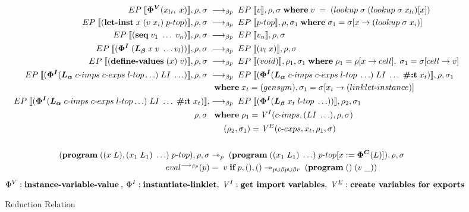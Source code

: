 \documentclass[sigplan,screen,anonymous]{acmart}
\def\dash {\text{-}}
\begin{document}
\begin{figure*}[tbp]
  \begin{align*}
    \redinput{\bm{\Phi^V}(x_{li},\; x)} \rel \redoutput{v}{\rho}{\sigma} \where v\; =\; (lookup\; \sigma\; (lookup\; \sigma\; x_{li})[x]) \\
    \redinput{(\textbf{let\dash inst}\; x\; (v\;x_i)\; p\dash top)} \rel \redoutput{p\dash top}{\rho}{\sigma_1} \where \sigma_1 = \sigma[x\rightarrow (lookup\; \sigma\; x_i)] \\
    \redinput{(\textbf{seq}\; v_{1}\; \ldots\; v_{n})} \rel \redoutput{v_{n}}{\rho}{\sigma} \\
    \redinput{(\bm{\Phi^I}\; (\lb\; x\; v\; \ldots v_{l}))} \rel \redoutput{(v_{l}\; x)}{\rho}{\sigma} \\
    \redinput{(\textbf{define\dash values}\; (x)\; v)} \rel \redoutput{(void)}{\rho_1}{\sigma_1} \where \rho_1 = \rho[x\rightarrow cell],\; \sigma_1 = \sigma[cell\rightarrow v] \\
    \redinput{(\bm{\Phi^I}(\la\; c\dash imps \; c\dash exps \; l\dash top \ldots)\; LI\; \ldots)} \rel \redoutput{(\bm{\Phi^I}(\la\; c\dash imps \; c\dash exps \; l\dash top\; \ldots)\; LI\; \ldots\; \textbf{\#:t}\; x_{t})}{\rho}{\sigma_1} \\
    \;          &\;\; \where x_t = (gensym), \sigma_1 = \sigma[x_t\rightarrow (linklet\dash instance)] \\
    EP\;\llbracket (\bm{\Phi^I}(\la\; c\dash imps \; c\dash exps \; l\dash top \ldots)\; LI\; \ldots\; \textbf{\#:t}\; x_{t}) \rrbracket, \rel \redoutput{(\bm{\Phi^I}(\lb\; x_{t}\; l\dash top\; \ldots))}{\rho_2}{\sigma_1} \\
    \rho, \sigma\; &\;\; \where \rho_1 = \mathit{V}^I(c\dash imps, (LI\; \ldots), \rho, \sigma) \\
    \;          &\;\; \hspace{0.4cm} (\rho_2, \sigma_1) = \mathit{V}^E(c\dash exps, x_t, \rho_1, \sigma) \\ \\
    (\textbf{program}\; ((x\;L),(x_1\;L_1)\;\ldots)\;p\dash top), \rho, \sigma &\twoheadrightarrow_{p}\; (\textbf{program}\; ((x_1\;L_1)\;\ldots)\;p\dash top[x := \bm{\Phi^C}(L)]), \rho, \sigma \\
    eval^{\longrightarrow_{\beta p}}(p) &=\; v\; \textbf{if}\; p, (), () \twoheadrightarrow_{p\cup\beta p\cup\beta r} \; (\textbf{program}\; ()\;(v\;\_)) \\
  \end{align*}
  \hfill \footnotesize $\Phi^V : \textbf{instance\dash variable\dash value}\:,\: \Phi^I : \textbf{instantiate\dash linklet},\: \mathit{V}^I : \textbf{get  import variables},\: \mathit{V}^E : \textbf{create variables for exports}$
\caption{Reduction Relation}
\label{fig:reduction}
\end{figure*}
\end{document}
